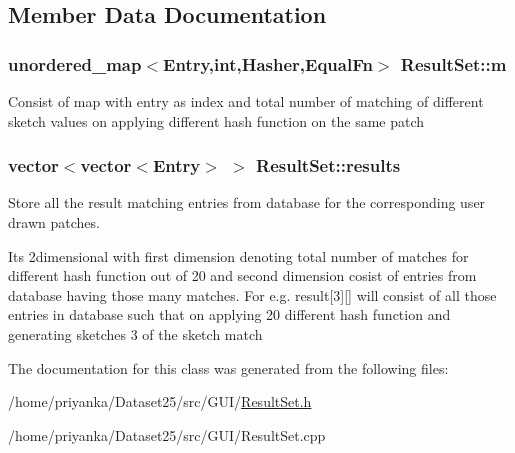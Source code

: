 \subsection{\-Member \-Data \-Documentation}
\hypertarget{classResultSet_ad62d4fd4f4e32c4dec4ddfd6ee1ec4dc}{
\subsubsection[{m}]{\setlength{\rightskip}{0pt plus 5cm}unordered\-\_\-map$<${\bf \-Entry},int,{\bf \-Hasher},{\bf \-Equal\-Fn}$>$ {\bf \-Result\-Set\-::m}}}\label{classResultSet_ad62d4fd4f4e32c4dec4ddfd6ee1ec4dc}
\-Consist of map with entry as index and total number of matching of different sketch values on applying different hash function on the same patch \hypertarget{classResultSet_af94fb0e3ab0007c7c0369e6fbb3a2f86}{
\subsubsection[{results}]{\setlength{\rightskip}{0pt plus 5cm}vector$<$vector$<${\bf \-Entry}$>$ $>$ {\bf \-Result\-Set\-::results}}}\label{classResultSet_af94fb0e3ab0007c7c0369e6fbb3a2f86}


\-Store all the result matching entries from database for the corresponding user drawn patches. 

\-Its 2dimensional with first dimension denoting total number of matches for different hash function out of 20 and second dimension cosist of entries from database having those many matches. \-For e.\-g. result\mbox{[}3\mbox{]}\mbox{[}\mbox{]} will consist of all those entries in database such that on applying 20 different hash function and generating sketches 3 of the sketch match 

\-The documentation for this class was generated from the following files\-:\begin{DoxyCompactItemize}
\item 
/home/priyanka/\-Dataset25/src/\-G\-U\-I/\hyperlink{ResultSet_8h}{\-Result\-Set.\-h}\item 
/home/priyanka/\-Dataset25/src/\-G\-U\-I/\-Result\-Set.\-cpp\end{DoxyCompactItemize}
